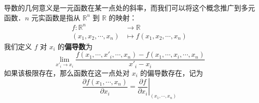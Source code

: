 

导数的几何意义是一元函数在某一点处的斜率，而我们可以将这个概念推广到多元函数．$n$ 元实函数是指从 $\mathbb{R} ^n$ 到 $\mathbb{R}$ 的映射：
\begin{equation}
\begin{aligned}
f:\mathbb{R} ^n&\rightarrow \mathbb{R}\\
(x_1,x_2,\cdots,x_n)&\mapsto f(x_1,x_2,\cdots,x_n)
\end{aligned}
\end{equation}
我们定义 $f$ 对 $x_i$ 的\textbf{偏导数}为
\begin{equation}
\lim\limits_{x'_i\rightarrow x_{i}}\frac{f(x_1,\cdots,x'_i,\cdots,x_n)-f(x_1,\cdots,x_i,\cdots,x_n)}{x'_i-x_i}
\end{equation}
如果该极限存在，那么函数在这一点处对 $x_i$ 的偏导数存在，记为
\begin{equation}
\frac{\partial f(x_1,\cdots,x_n)}{\partial x_i}=\left.\frac{\partial f}{\partial x_i}\right|_{(x_1,\cdots,x_n)}
\end{equation}
